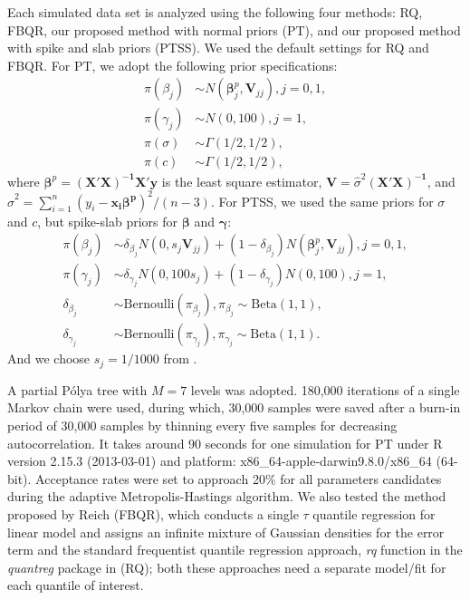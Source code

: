\documentclass[12pt]{article}
\newcommand{\polya}{P\'{o}lya}
\begin{document}
Each simulated data set is analyzed using the following four methods:
RQ, FBQR, our proposed method with normal priors (PT), and our
proposed method with spike and slab priors (PTSS).  We used the
default settings for RQ and FBQR.  For PT, we adopt the following
prior specifications:
\begin{align*}
  \pi(\beta_j) & \sim N(\bm \beta_j^p, \bm V_{jj}) , j = 0, 1,\\
  \pi(\gamma_j) & \sim N(0, 100), j = 1,\\
  \pi(\sigma) & \sim \Gamma (1/2, 1/2), \\
  \pi(c) & \sim \Gamma(1/2, 1/2),
\end{align*}
where $\bm \beta^p = \bm{(X'X)^{-1}X'y}$ is the least square
estimator, $\bm V = \hat{\sigma}^2\bm{(X'X)^{-1}}$, and $\hat{\sigma}^2 =
\sum_{i = 1}^n (y_i - \bm {x_i \beta^p})^2/ (n - 3)$.
For PTSS, we used the same priors for $\sigma$ and $c$, but spike-slab
priors for $\bm \beta$ and $\bm \gamma$:
\begin{align*}
  \pi(\beta_j) & \sim \delta_{\beta_j}N(0, s_j\bm V_{jj}) +  (1 - \delta_{\beta_j})N(\bm \beta_j^p, \bm V_{jj}) , j = 0, 1, \\
  \pi(\gamma_j) & \sim \delta_{\gamma_j}N(0, 100s_j) + (1 - \delta_{\gamma_j}) N(0, 100), j = 1, \\
  \delta_{\beta_j} & \sim \mbox{Bernoulli}(\pi_{\beta_j}) , \pi_{\beta_j} \sim \mbox{Beta}(1, 1),\\
  \delta_{\gamma_j} & \sim \mbox{Bernoulli}(\pi_{\gamma_j}),
  \pi_{\gamma_j} \sim \mbox{Beta}(1, 1).
\end{align*}
And we choose $s_j = 1/1000$ from \cite{george1993}.

A partial \polya{} tree with $M=7$ levels was adopted. 180,000 iterations of a
single Markov chain were used, during which, 30,000 samples were saved
after a burn-in period of 30,000 samples by thinning every five samples for
decreasing autocorrelation.  It takes around 90 seconds
for one simulation for PT under R version 2.15.3 (2013-03-01) and
platform: x86\_64-apple-darwin9.8.0/x86\_64 (64-bit). Acceptance rates
were set to approach 20\% for all parameters
candidates during the adaptive Metropolis-Hastings algorithm.  We also
tested the method proposed by Reich (FBQR), which conducts a single
$\tau$ quantile regression for linear model and assigns an infinite
mixture of Gaussian densities for the error term and the standard
frequentist quantile regression approach, \textit{rq} function in the
\textit{quantreg} package \citep{quantreg} in \cite{R} (RQ); both these approaches need a separate model/fit for each quantile of interest.
\end{document}
